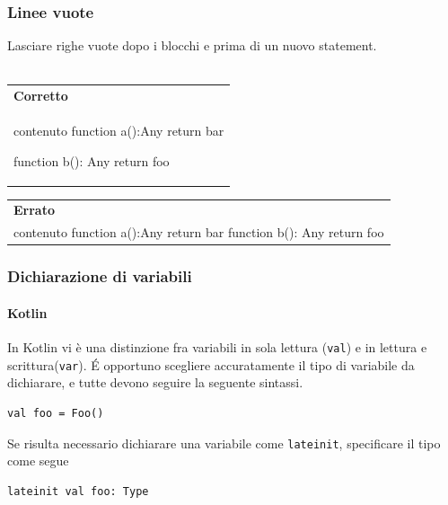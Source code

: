 \subsubsection{Linee vuote} Lasciare righe vuote dopo i blocchi e prima di un nuovo statement. \\\\
\begin{minipage}{0.45\textwidth}
	\begin{tabular}{p{\textwidth}}	
		\textbf{Corretto}
		\begin{lstlisting}
	\\contenuto
		function a():Any {
		return bar
		}
		
		function b(): Any {
		return foo
		}
					
		\end{lstlisting}
	\end{tabular}
\end{minipage}
\hfill
\begin{minipage}{0.45\textwidth}
	\begin{tabular}{|p{\textwidth}}
		
		\textbf{Errato}
		\begin{lstlisting}
	\\contenuto
		function a():Any {
		return bar
		}	
		function b(): Any {
		return foo
		}
		\end{lstlisting}
	\end{tabular}
	
\end{minipage}
\subsubsection{Dichiarazione di variabili}

\paragraph{Kotlin}
In Kotlin vi è una distinzione fra variabili in sola lettura (\texttt{val}) e in lettura e scrittura(\texttt{var}). \'E opportuno scegliere accuratamente il tipo di variabile da dichiarare, e tutte devono seguire la seguente sintassi.
\begin{lstlisting}
val foo = Foo() 						
\end{lstlisting}

Se risulta necessario dichiarare una variabile come \texttt{lateinit}, specificare il tipo come segue
\begin{lstlisting}
lateinit val foo: Type							
\end{lstlisting}

